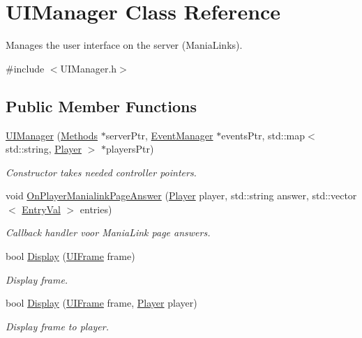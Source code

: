 \hypertarget{classUIManager}{\section{U\-I\-Manager Class Reference}
\label{classUIManager}
}


Manages the user interface on the server (Mania\-Links).  




{\ttfamily \#include $<$U\-I\-Manager.\-h$>$}

\subsection*{Public Member Functions}
\begin{DoxyCompactItemize}
\item 
\hyperlink{classUIManager_a4d6da1c7d4c1100402fb9384080c3cb2}{U\-I\-Manager} (\hyperlink{classMethods}{Methods} $\ast$server\-Ptr, \hyperlink{classEventManager}{Event\-Manager} $\ast$events\-Ptr, std\-::map$<$ std\-::string, \hyperlink{structPlayer}{Player} $>$ $\ast$players\-Ptr)
\begin{DoxyCompactList}\small\item\em Constructor takes needed controller pointers. \end{DoxyCompactList}\item 
void \hyperlink{classUIManager_a79bae5bfa896f37455d10256caa8b95b}{On\-Player\-Manialink\-Page\-Answer} (\hyperlink{structPlayer}{Player} player, std\-::string answer, std\-::vector$<$ \hyperlink{structEntryVal}{Entry\-Val} $>$ entries)
\begin{DoxyCompactList}\small\item\em Callback handler voor Mania\-Link page answers. \end{DoxyCompactList}\item 
bool \hyperlink{classUIManager_a97f069a4a1c54f6e9569a194834e090c}{Display} (\hyperlink{structUIFrame}{U\-I\-Frame} frame)
\begin{DoxyCompactList}\small\item\em Display frame. \end{DoxyCompactList}\item 
bool \hyperlink{classUIManager_a83370680d61bea5a5464127a5f11b9a9}{Display} (\hyperlink{structUIFrame}{U\-I\-Frame} frame, \hyperlink{structPlayer}{Player} player)
\begin{DoxyCompactList}\small\item\em Display frame to player. \end{DoxyCompactList}\item 

\end{DoxyCompactItemize}
